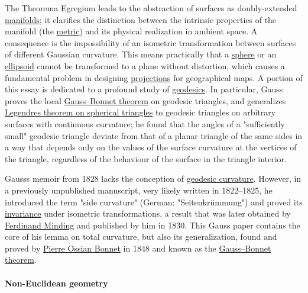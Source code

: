 The Theorema Egregium leads to the abstraction of surfaces as doubly-extended \href{https://en.wikipedia.org/wiki/Manifold}{manifolds}; it clarifies the distinction between the intrinsic properties of the manifold (the \href{https://en.wikipedia.org/wiki/Metric_tensor}{metric}) and its physical realization in ambient space. A consequence is the impossibility of an isometric transformation between surfaces of different Gaussian curvature. This means practically that a \href{https://en.wikipedia.org/wiki/Sphere}{sphere} or an \href{https://en.wikipedia.org/wiki/Ellipsoid}{ellipsoid} cannot be transformed to a plane without distortion, which causes a fundamental problem in designing \href{https://en.wikipedia.org/wiki/Map_projection}{projections} for geographical maps. A portion of this essay is dedicated to a profound study of \href{https://en.wikipedia.org/wiki/Geodesic}{geodesics}. In particular, Gauss proves the local \href{https://en.wikipedia.org/wiki/Gauss–Bonnet_theorem}{Gauss--Bonnet theorem} on geodesic triangles, and generalizes \href{https://en.wikipedia.org/wiki/Legendre's_theorem_on_spherical_triangles}{Legendre\textquotesingle s theorem on spherical triangles} to geodesic triangles on arbitrary surfaces with continuous curvature; he found that the angles of a "sufficiently small" geodesic triangle deviate from that of a planar triangle of the same sides in a way that depends only on the values of the surface curvature at the vertices of the triangle, regardless of the behaviour of the surface in the triangle interior.

Gauss\textquotesingle s memoir from 1828 lacks the conception of \href{https://en.wikipedia.org/wiki/Geodesic_curvature}{geodesic curvature}. However, in a previously unpublished manuscript, very likely written in 1822--1825, he introduced the term "side curvature" (German: "Seitenkrümmung") and proved its \href{https://en.wikipedia.org/wiki/Invariant_(mathematics)}{invariance} under isometric transformations, a result that was later obtained by \href{https://en.wikipedia.org/wiki/Ferdinand_Minding}{Ferdinand Minding} and published by him in 1830. This Gauss paper contains the core of his lemma on total curvature, but also its generalization, found and proved by \href{https://en.wikipedia.org/wiki/Pierre_Ossian_Bonnet}{Pierre Ossian Bonnet} in 1848 and known as the \href{https://en.wikipedia.org/wiki/Gauss–Bonnet_theorem}{Gauss--Bonnet theorem}.


\paragraph{Non-Euclidean geometry}\label{Non-Euclidean_geometry}

